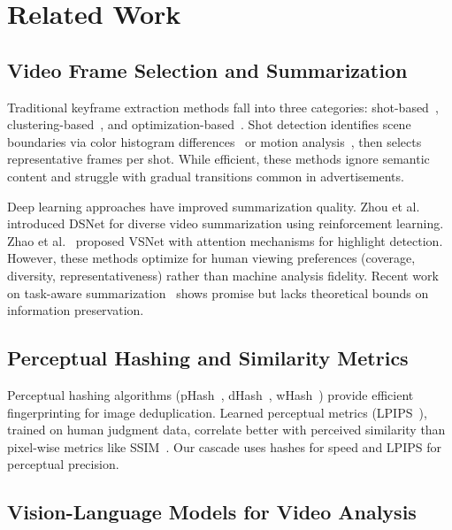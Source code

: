 \documentclass[sigconf,nonacm]{acmart}
\begin{document}
\section{Related Work}
\label{sec:related_work}

\subsection{Video Frame Selection and Summarization}

Traditional keyframe extraction methods fall into three categories: shot-based~\cite{potapov2014category}, clustering-based~\cite{hanjalic2004unified}, and optimization-based~\cite{das2011video}. Shot detection identifies scene boundaries via color histogram differences~\cite{cernekova2006entropy} or motion analysis~\cite{trivedi2007multi}, then selects representative frames per shot. While efficient, these methods ignore semantic content and struggle with gradual transitions common in advertisements.

Deep learning approaches have improved summarization quality. Zhou et al.~\cite{zhou2018deep} introduced DSNet for diverse video summarization using reinforcement learning. Zhao et al.~\cite{zhao2021video} proposed VSNet with attention mechanisms for highlight detection. However, these methods optimize for human viewing preferences (coverage, diversity, representativeness) rather than machine analysis fidelity. Recent work on task-aware summarization~\cite{rochan2023task} shows promise but lacks theoretical bounds on information preservation.

\subsection{Perceptual Hashing and Similarity Metrics}

Perceptual hashing algorithms (pHash~\cite{zauner2010framework}, dHash~\cite{krawczyk2015phash}, wHash~\cite{wang2019robust}) provide efficient fingerprinting for image deduplication. Learned perceptual metrics (LPIPS~\cite{zhang2018unreasonable}), trained on human judgment data, correlate better with perceived similarity than pixel-wise metrics like SSIM~\cite{wang2004image}. Our cascade uses hashes for speed and LPIPS for perceptual precision.

\subsection{Vision-Language Models for Video Analysis}
\end{document}
